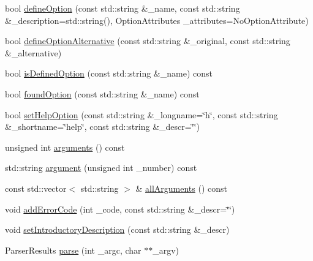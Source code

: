 \begin{DoxyCompactItemize}
\item 
bool \hyperlink{class_command_line_processing_1_1_argv_parser_a894849ef3ab1eebf40fad8434414393a}{define\-Option} (const std\-::string \&\-\_\-name, const std\-::string \&\-\_\-description=std\-::string(), Option\-Attributes \-\_\-attributes=No\-Option\-Attribute)
\item 
bool \hyperlink{class_command_line_processing_1_1_argv_parser_a23f0a81ee9ad8473f10ecec73bf0d714}{define\-Option\-Alternative} (const std\-::string \&\-\_\-original, const std\-::string \&\-\_\-alternative)
\item 
bool \hyperlink{class_command_line_processing_1_1_argv_parser_a29f2a2073758128646309420cdc5d903}{is\-Defined\-Option} (const std\-::string \&\-\_\-name) const 
\item 
bool \hyperlink{class_command_line_processing_1_1_argv_parser_a9fc467992394658e1bd3f6d32614cf4f}{found\-Option} (const std\-::string \&\-\_\-name) const 
\item 
bool \hyperlink{class_command_line_processing_1_1_argv_parser_a48527d8fd9a49d3ac00112f1eb31a0f9}{set\-Help\-Option} (const std\-::string \&\-\_\-longname=\char`\"{}h\char`\"{}, const std\-::string \&\-\_\-shortname=\char`\"{}help\char`\"{}, const std\-::string \&\-\_\-descr=\char`\"{}\char`\"{})
\item 
unsigned int \hyperlink{class_command_line_processing_1_1_argv_parser_ac982ebf837b576898661c0bfeeb487ec}{arguments} () const 
\item 
std\-::string \hyperlink{class_command_line_processing_1_1_argv_parser_a1cbefd19d4c8c62a203d1a1922960331}{argument} (unsigned int \-\_\-number) const 
\item 
const std\-::vector$<$ std\-::string $>$ \& \hyperlink{class_command_line_processing_1_1_argv_parser_a59bfb6a90912a429100a6e05a6544b36}{all\-Arguments} () const 
\item 
void \hyperlink{class_command_line_processing_1_1_argv_parser_a26ee6c4c955cace021993c2aa91c6be3}{add\-Error\-Code} (int \-\_\-code, const std\-::string \&\-\_\-descr=\char`\"{}\char`\"{})
\item 
void \hyperlink{class_command_line_processing_1_1_argv_parser_a47ab1e3c4b8fabce2288d4d4ae5b6026}{set\-Introductory\-Description} (const std\-::string \&\-\_\-descr)
\item 
Parser\-Results \hyperlink{class_command_line_processing_1_1_argv_parser_a1a3306fa666ee4619ecd5dfcfb2bd7ba}{parse} (int \-\_\-argc, char $\ast$$\ast$\-\_\-argv)
$$
\end{DoxyCompactItemize}
